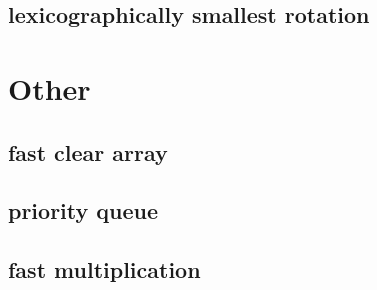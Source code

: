 \documentclass[a4paper,10pt,twocolumn,oneside]{article}
\begin{document}
\subsection{lexicographically smallest rotation}


\section{Other}
\subsection{fast clear array}

\subsection{priority queue}

\subsection{fast multiplication}

\end{document}
